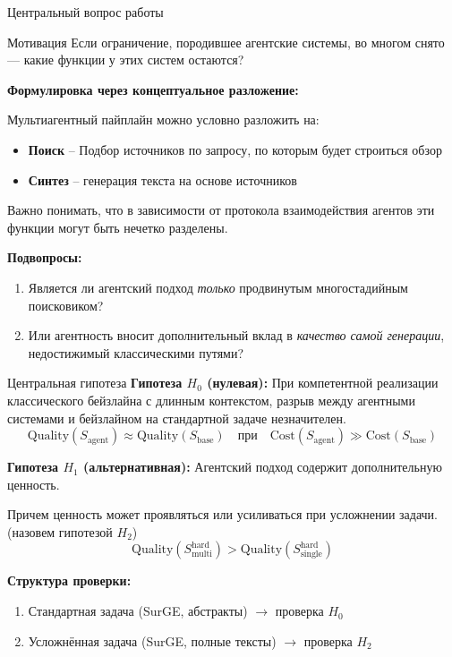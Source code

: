 \documentclass[10pt,aspectratio=169]{beamer}
\begin{document}
\begin{frame}{Центральный вопрос работы}
  \begin{block}{Мотивация}
    Если ограничение, породившее агентские системы, во многом снято --- какие функции у этих систем остаются?
  \end{block}

  \textbf{Формулировка через концептуальное разложение:}

  \vspace{0.2cm}
  Мультиагентный пайплайн можно условно разложить на:
  \begin{itemize}
    \item \textbf{Поиск} -- Подбор источников по запросу, по которым будет строиться обзор
    \item \textbf{Синтез} -- генерация текста на основе источников
  \end{itemize}

  Важно понимать, что в зависимости от протокола взаимодействия агентов эти функции могут быть нечетко разделены.

  \vspace{0.3cm}
  \textbf{Подвопросы:}
  \begin{enumerate}
    \item Является ли агентский подход \emph{только} продвинутым многостадийным поисковиком?
    \item Или агентность вносит дополнительный вклад в \emph{качество самой генерации}, недостижимый классическими путями?
  \end{enumerate}
\end{frame}

\begin{frame}{Центральная гипотеза}
  \textbf{Гипотеза $H_0$ (нулевая):} При компетентной реализации классического бейзлайна с длинным контекстом, разрыв между агентными системами и бейзлайном на стандартной задаче незначителен.
  \[
    \text{Quality}(S_{\text{agent}}) \approx \text{Quality}(S_{\text{base}}) \quad \text{при} \quad \text{Cost}(S_{\text{agent}}) \gg \text{Cost}(S_{\text{base}})
  \]

  \textbf{Гипотеза $H_1$ (альтернативная):} Агентский подход содержит дополнительную ценность.

  Причем ценность может проявляться или усиливаться при усложнении задачи. (назовем гипотезой $H_2$)
  \[
    \text{Quality}(S_{\text{multi}}^{\text{hard}}) > \text{Quality}(S_{\text{single}}^{\text{hard}})
  \]

  \textbf{Структура проверки:}
  \begin{enumerate}
    \item Стандартная задача (SurGE, абстракты) $\to$ проверка $H_0$
    \item Усложнённая задача (SurGE, полные тексты) $\to$ проверка $H_2$
  \end{enumerate}

\end{frame}
\end{document}
